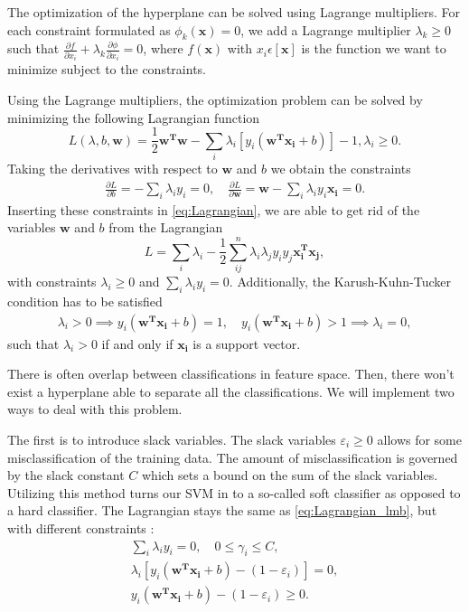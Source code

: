 The optimization of the hyperplane can be solved using Lagrange multipliers. 
For each constraint formulated as $\phi_k (\boldsymbol{x})=0$, we add a Lagrange
multiplier $\lambda _k \ge 0$ such that $\frac{\partial f}{\partial x_i}+\lambda_k \frac{\partial \phi }{\partial x_i}=0$,
where $f(\boldsymbol{x})$ with $x_i \epsilon [\boldsymbol{x}]$ is the function we want to minimize 
subject to the constraints.

Using the Lagrange multipliers, the optimization problem can be solved by minimizing 
the following Lagrangian function \cite{w46}
\begin{equation}
	L(\lambda ,b,\boldsymbol{w})=\frac{1}{2}\boldsymbol{w^Tw}-\sum_{i} \lambda _i[y_i(\boldsymbol{w^Tx_i}+b)]-1,\lambda _i \ge0. 
	\label{eq:Lagrangian}
\end{equation}
Taking the derivatives with respect to $\boldsymbol{w}$ and $b$ we obtain the constraints 
\begin{gather*}
\frac{\partial L}{\partial b}=-\sum_{i} \lambda _i y_i=0,
\quad \frac{\partial L}{\partial \boldsymbol{w} }= \boldsymbol{w} -\sum_{i} \lambda _i y_i \boldsymbol{x_i} =0.
\end{gather*}
Inserting these constraints in \autoref{eq:Lagrangian}, we are able to get rid 
of the variables $\boldsymbol{w}$ and $b$ from the Lagrangian
\begin{equation}
L = \sum_{i} \lambda _i - \frac{1}{2}\sum_{ij}^{n} \lambda _i \lambda _j y_i y_j \boldsymbol{x_i^Tx_j},
\label{eq:Lagrangian_lmb}
\end{equation}
with constraints $\lambda _i \ge 0$ and $\sum_{i} \lambda _iy_i=0$.
Additionally, the Karush-Kuhn-Tucker condition has to be satisfied
\begin{gather*}
\lambda _i >0 \implies y_i(\boldsymbol{w^Tx_i}+b)=1, \quad y_i(\boldsymbol{w^Tx_i}+b)>1 \implies \lambda _i = 0,
\end{gather*}
such that $\lambda _i>0$ if and only if $\boldsymbol{x_i}$ is a support vector. 

There is often overlap between classifications in feature space. Then, there 
won't exist a hyperplane able to separate all the classifications. We will 
implement two ways to deal with this problem. 

The first is to introduce slack variables. The slack variables 
$\varepsilon _i \ge  0$ allows for some misclassification of 
the training data. The amount of misclassification is governed by the 
slack constant $C$ which sets a bound on the sum of the slack variables.  
Utilizing this method turns our SVM in to a so-called soft classifier as 
opposed to a hard classifier. 
The Lagrangian stays the same as \autoref{eq:Lagrangian_lmb}, but 
with different constraints \cite{w46}:
\begin{gather*}
	\sum_{i} \lambda _i y_i = 0, \quad 0 \le \gamma _i \le C,\\
	\lambda _i[y_i(\boldsymbol{w^Tx_i}+b)-(1-\varepsilon _i)]=0,\\
y_i(\boldsymbol{w^Tx_i}+b)-(1-\varepsilon _i) \ge 0.
\end{gather*}

